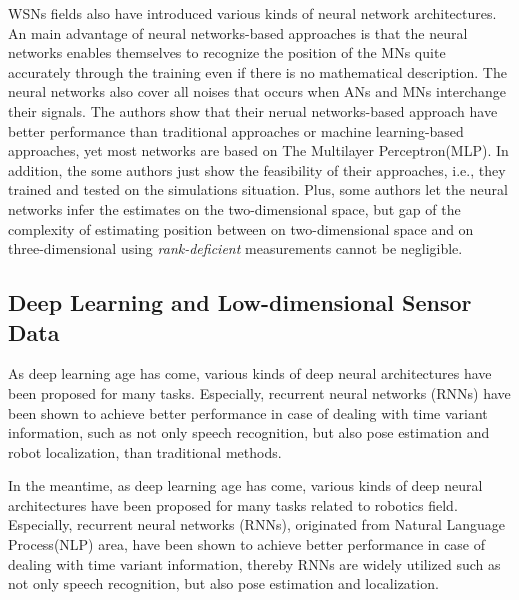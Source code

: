 \documentclass[letterpaper, 10 pt, conference]{ieeeconf}  %
\begin{document}
WSNs fields also have introduced various kinds of neural network architectures\cite{rahman2009localization, singh2013tdoa, abdelhadi2013efficient, kumar2016localization, banihashemian2018new}. An main advantage of neural networks-based approaches is that the neural networks enables themselves to recognize the position of the MNs quite accurately through the training even if there is no mathematical description. The neural networks also cover all noises that occurs when ANs and MNs interchange their signals. The authors show that their nerual networks-based approach have better performance than traditional approaches or machine learning-based approaches, yet most networks are based on The Multilayer Perceptron(MLP). In addition, the some authors just show the feasibility of their approaches, i.e., they trained and tested on the simulations situation. Plus, some authors let the neural networks infer the estimates on the two-dimensional space, but gap of the complexity of estimating position between on two-dimensional space and on three-dimensional using \textit{rank-deficient} measurements cannot be negligible.

\subsection{Deep Learning and Low-dimensional Sensor Data}

 As deep learning age has come, various kinds of deep neural architectures have been proposed for many tasks. Especially, recurrent neural networks (RNNs) have been shown to achieve better performance in case of dealing with time variant information, such as not only speech recognition, but also pose estimation and robot localization, than traditional methods. 


In the meantime, as deep learning age has come\cite{lecun2015deep}, various kinds of deep neural architectures have been proposed for many tasks related to robotics field. Especially, recurrent neural networks (RNNs), originated from Natural Language Process(NLP) area\cite{elman1990finding}, have been shown to achieve better performance in case of dealing with time variant information, thereby RNNs are widely utilized such as not only speech recognition, but also pose estimation and localization\cite{walch2017image, gladh2016deep, wang2017deepvo, kendall2015posenet, turan2018deep}. 
\end{document}
